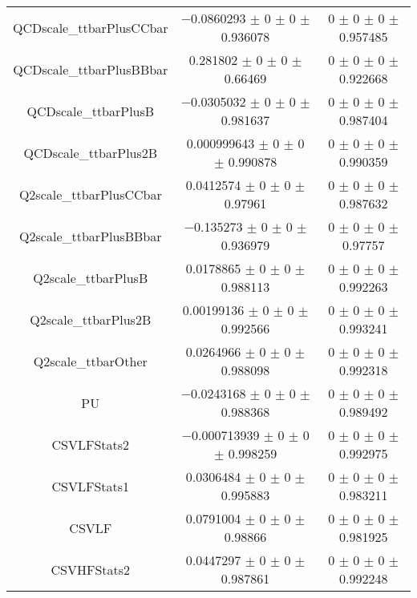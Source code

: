 \begin{table}
\begin{tabular}{ccc}
QCDscale\_ttbarPlusCCbar 	& \num{-0.0860293} $\pm$ \num{0} $\pm$ \num{0} $\pm$ \num{0.936078} 	& \num{0} $\pm$ \num{0} $\pm$ \num{0} $\pm$ \num{0.957485}\\
QCDscale\_ttbarPlusBBbar 	& \num{0.281802} $\pm$ \num{0} $\pm$ \num{0} $\pm$ \num{0.66469} 	& \num{0} $\pm$ \num{0} $\pm$ \num{0} $\pm$ \num{0.922668}\\
QCDscale\_ttbarPlusB 	& \num{-0.0305032} $\pm$ \num{0} $\pm$ \num{0} $\pm$ \num{0.981637} 	& \num{0} $\pm$ \num{0} $\pm$ \num{0} $\pm$ \num{0.987404}\\
QCDscale\_ttbarPlus2B 	& \num{0.000999643} $\pm$ \num{0} $\pm$ \num{0} $\pm$ \num{0.990878} 	& \num{0} $\pm$ \num{0} $\pm$ \num{0} $\pm$ \num{0.990359}\\
Q2scale\_ttbarPlusCCbar 	& \num{0.0412574} $\pm$ \num{0} $\pm$ \num{0} $\pm$ \num{0.97961} 	& \num{0} $\pm$ \num{0} $\pm$ \num{0} $\pm$ \num{0.987632}\\
Q2scale\_ttbarPlusBBbar 	& \num{-0.135273} $\pm$ \num{0} $\pm$ \num{0} $\pm$ \num{0.936979} 	& \num{0} $\pm$ \num{0} $\pm$ \num{0} $\pm$ \num{0.97757}\\
Q2scale\_ttbarPlusB 	& \num{0.0178865} $\pm$ \num{0} $\pm$ \num{0} $\pm$ \num{0.988113} 	& \num{0} $\pm$ \num{0} $\pm$ \num{0} $\pm$ \num{0.992263}\\
Q2scale\_ttbarPlus2B 	& \num{0.00199136} $\pm$ \num{0} $\pm$ \num{0} $\pm$ \num{0.992566} 	& \num{0} $\pm$ \num{0} $\pm$ \num{0} $\pm$ \num{0.993241}\\
Q2scale\_ttbarOther 	& \num{0.0264966} $\pm$ \num{0} $\pm$ \num{0} $\pm$ \num{0.988098} 	& \num{0} $\pm$ \num{0} $\pm$ \num{0} $\pm$ \num{0.992318}\\
PU 	& \num{-0.0243168} $\pm$ \num{0} $\pm$ \num{0} $\pm$ \num{0.988368} 	& \num{0} $\pm$ \num{0} $\pm$ \num{0} $\pm$ \num{0.989492}\\
CSVLFStats2 	& \num{-0.000713939} $\pm$ \num{0} $\pm$ \num{0} $\pm$ \num{0.998259} 	& \num{0} $\pm$ \num{0} $\pm$ \num{0} $\pm$ \num{0.992975}\\
CSVLFStats1 	& \num{0.0306484} $\pm$ \num{0} $\pm$ \num{0} $\pm$ \num{0.995883} 	& \num{0} $\pm$ \num{0} $\pm$ \num{0} $\pm$ \num{0.983211}\\
CSVLF 	& \num{0.0791004} $\pm$ \num{0} $\pm$ \num{0} $\pm$ \num{0.98866} 	& \num{0} $\pm$ \num{0} $\pm$ \num{0} $\pm$ \num{0.981925}\\
CSVHFStats2 	& \num{0.0447297} $\pm$ \num{0} $\pm$ \num{0} $\pm$ \num{0.987861} 	& \num{0} $\pm$ \num{0} $\pm$ \num{0} $\pm$ \num{0.992248}\\

\end{tabular}
\end{table}
